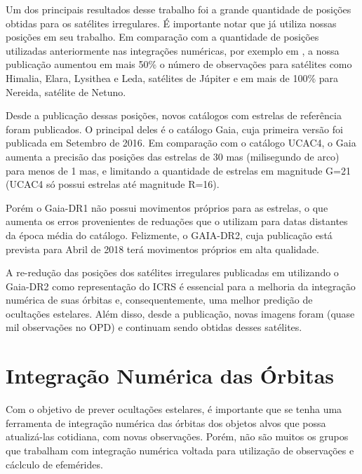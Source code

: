 \documentclass[12pt,a4paper]{report}
\begin{document}
Um dos principais resultados desse trabalho foi a grande quantidade de posições obtidas para os satélites irregulares. É importante notar que \cite{Brozovic2017} já utiliza nossas posições em seu trabalho. Em comparação com a quantidade de posições utilizadas anteriormente nas integrações numéricas, por exemplo em \cite{Jacobson2012}, a nossa publicação aumentou em mais 50\% o número de observações para satélites como Himalia, Elara, Lysithea e Leda, satélites de Júpiter e em mais de 100\% para Nereida, satélite de Netuno.

Desde a publicação dessas posições, novos catálogos com estrelas de referência foram publicados. O principal deles é o catálogo Gaia, cuja primeira versão foi publicada em Setembro de 2016. Em comparação com o catálogo UCAC4, o Gaia aumenta a precisão das posições das estrelas de 30 mas (milisegundo de arco) para menos de 1 mas, e limitando a quantidade de estrelas em magnitude G=21 (UCAC4 só possui estrelas até magnitude R=16).

Porém o Gaia-DR1 não possui movimentos próprios para as estrelas, o que aumenta os erros provenientes de reduações que o utilizam para datas distantes da época média do catálogo. Felizmente, o GAIA-DR2, cuja publicação está prevista para Abril de 2018 terá movimentos próprios em alta qualidade.

A re-redução das posições dos satélites irregulares publicadas em \cite{GomesJunior2015-Irregular} utilizando o Gaia-DR2 como representação do ICRS é essencial para a melhoria da integração numérica de suas órbitas e, consequentemente, uma melhor predição de ocultações estelares. Além disso, desde a publicação, novas imagens foram (quase mil observações no OPD) e continuam sendo obtidas desses satélites. %

\section{Integração Numérica das Órbitas} \label{Sec:Integ}

\indent \indent Com o objetivo de prever ocultações estelares, é importante que se tenha uma ferramenta de integração numérica das órbitas dos objetos alvos que possa atualizá-las cotidiana, com novas observações. Porém, não são muitos os grupos que trabalham com integração numérica voltada para utilização de observações e cáclculo de efemérides.
\end{document}
